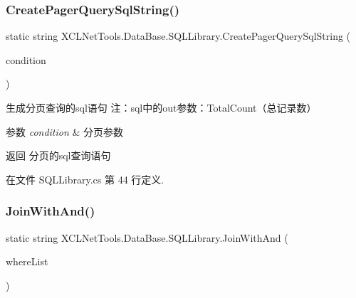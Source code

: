 \subsubsection{\texorpdfstring{Create\+Pager\+Query\+Sql\+String()}{CreatePagerQuerySqlString()}}
{\footnotesize\ttfamily static string X\+C\+L\+Net\+Tools.\+Data\+Base.\+S\+Q\+L\+Library.\+Create\+Pager\+Query\+Sql\+String (\begin{DoxyParamCaption}\item[{\hyperlink{class_x_c_l_net_tools_1_1_entity_1_1_sql_pager_condition_entity}{X\+C\+L\+Net\+Tools.\+Entity.\+Sql\+Pager\+Condition\+Entity}}]{condition }\end{DoxyParamCaption})\hspace{0.3cm}{\ttfamily [static]}}



生成分页查询的sql语句 注：sql中的out参数：\+Total\+Count（总记录数） 


\begin{DoxyParams}{参数}
{\em condition} & 分页参数\\
\hline
\end{DoxyParams}
\begin{DoxyReturn}{返回}
分页的sql查询语句
\end{DoxyReturn}


在文件 S\+Q\+L\+Library.\+cs 第 44 行定义.

\mbox{\label{class_x_c_l_net_tools_1_1_data_base_1_1_s_q_l_library_acc256989f11747ac9cc52cd138088f81}} 
\subsubsection{\texorpdfstring{Join\+With\+And()}{JoinWithAnd()}}
{\footnotesize\ttfamily static string X\+C\+L\+Net\+Tools.\+Data\+Base.\+S\+Q\+L\+Library.\+Join\+With\+And (\begin{DoxyParamCaption}\item[{List$<$ string $>$}]{where\+List }\end{DoxyParamCaption})\hspace{0.3cm}{\ttfamily [static]}}




